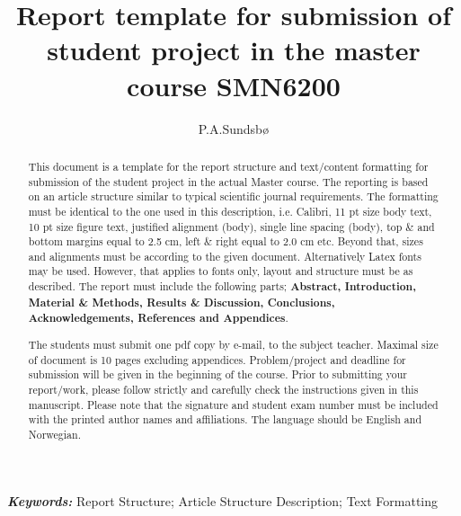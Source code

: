 \documentclass[a4paper,12pt]{extarticle}
\title{Report template for submission of student project in the master course SMN6200}
\author{P.A.Sundsbø}
\date{\parbox{\linewidth}{\centering
    \today\endgraf\bigskip
    \textit{\small UiT - The Arctic University of Norway, P.O. Box 385, N-8505 Narvik, Norway}
}}
\providecommand{\keywords}[1]{\textbf{\textit{\small{Keywords:}}} #1}
\begin{document}
  
\maketitle

\begin{abstract} 
\noindent This document is a template for the report structure and text/content formatting for submission of the student project in the actual Master course. The reporting is based on an article structure similar to typical scientific journal requirements. The formatting must be identical to the one used in this description, i.e. Calibri, 11 pt size body text, 10 pt size figure text, justified alignment (body), single line spacing (body), top \& and bottom margins equal to 2.5 cm, left \& right equal to 2.0 cm etc. Beyond that, sizes and alignments must be according to the given document. Alternatively Latex fonts may be used. However, that applies to fonts only, layout and structure must be as described. The report must include the following parts; \textbf{Abstract, Introduction, Material \& Methods, Results \& Discussion, Conclusions, Acknowledgements, References and Appendices}.

The students must submit one pdf copy by e-mail, to the subject teacher. Maximal size of document is 10 pages excluding appendices. Problem/project and deadline for submission will be given in the beginning of the course. Prior to submitting your report/work, please follow strictly and carefully check the instructions given in this manuscript. Please note that the signature and student exam number must be included with the printed author names and affiliations. The language should be English and Norwegian.

\end{abstract}

\keywords{\small{Report Structure}; \small{Article Structure Description}; \small{Text Formatting}}

\end{document}
